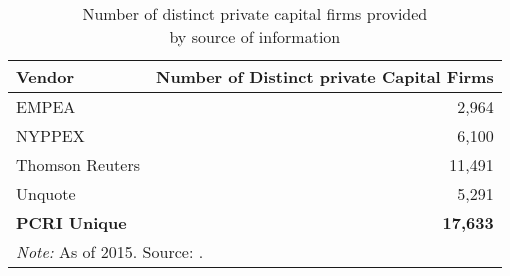 
\begin{table}
    \centering

\caption{\label{tab:pcritable1}Number of distinct private capital firms provided \\by source of information}
\begin{tabular}[t]{lr}
\toprule
Vendor & Number of Distinct private Capital Firms\\
\midrule
EMPEA & 2,964\\
NYPPEX & 6,100\\
Thomson Reuters & 11,491\\
Unquote & 5,291\\
\midrule
\textbf{PCRI Unique} & \textbf{17,633}\\
\bottomrule
\multicolumn{2}{l}{\textit{Note: } As of 2015. Source: \citet{jeng2015}.}\\
\end{tabular}
\end{table}

